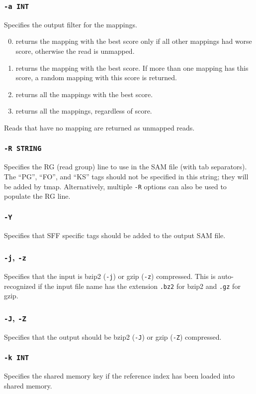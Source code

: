 \documentclass[a4paper,12pt]{book}
\newcommand{\TT}[1]{{\tt #1}} %
\begin{document}
\subsubsection{\TT{-a INT}}
Specifies the output filter for the mappings.
\begin{enumerate}
	\setcounter{enumi}{-1} %
	\item returns the mapping with the best score only if all other mappings had worse score, otherwise the read is unmapped.
	\item returns the mapping with the best score.  
		If more than one mapping has this score, a random mapping with this score is returned.
	\item returns all the mappings with the best score.
	\item returns all the mappings, regardless of score.
\end{enumerate}
Reads that have no mapping are returned as unmapped reads.

\subsubsection{\TT{-R STRING}}
Specifies the RG (read group) line to use in the SAM file (with tab separators).
The ``PG'', ``FO'', and ``KS'' tags should not be specified in this string; they will be added by tmap.
Alternatively, multiple \TT{-R} options can also be used to populate the RG line. 

\subsubsection{\TT{-Y}}
Specifies that SFF specific tags should be added to the output SAM file.

\subsubsection{\TT{-j}, \TT{-z}}
Specifies that the input is bzip2 (\TT{-j}) or gzip (\TT{-z}) compressed.
This is auto-recognized if the input file name has the extension \TT{.bz2} for bzip2 and \TT{.gz} for gzip.

\subsubsection{\TT{-J}, \TT{-Z}}
Specifies that the output should be bzip2 (\TT{-J}) or gzip (\TT{-Z}) compressed.

\subsubsection{\TT{-k INT}}
Specifies the shared memory key if the reference index has been loaded into shared memory.
\end{document}
